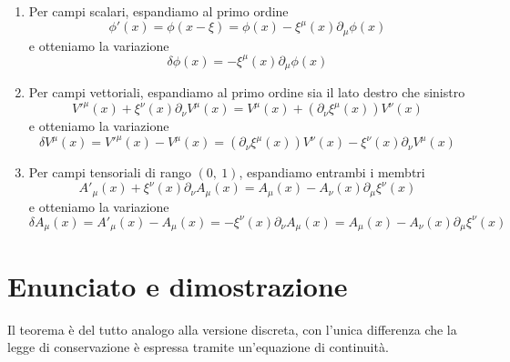     \begin{enumerate}
        \item Per campi scalari, espandiamo al primo ordine
    \begin{equation*}
        \phi'(x) = \phi(x - \xi) = \phi(x) - \xi^\mu(x) \partial_\mu \phi(x)
    \end{equation*}  
        e otteniamo la variazione
    \begin{equation}\label{variazionescalare}
        \delta \phi(x) = - \xi^\mu(x) \partial_\mu \phi(x)
    \end{equation} 
        \item Per campi vettoriali, espandiamo al primo ordine sia il lato destro che sinistro
    \begin{equation*}
        V'^\mu(x) + \xi^\nu(x) \partial_\nu V^\mu (x) = V^\mu(x) + (\partial_\nu \xi^\mu(x)) V^\nu(x)
    \end{equation*}
        e otteniamo la variazione
    \begin{equation}\label{variazionevett}
        \delta V^\mu(x) = V'^\mu(x) - V^\mu(x) = (\partial_\nu \xi^\mu(x)) V^\nu(x) - \xi^\nu (x)\partial_\nu V^\mu(x)
    \end{equation}
        \item Per campi tensoriali di rango $(0,~1)$, espandiamo entrambi i membtri 
    \begin{equation*}
        A'_\mu(x) + \xi^\nu(x) \partial_\nu A_\mu (x) = A_\mu(x) - A_\nu(x) \partial_\mu \xi^\nu(x)
    \end{equation*}
        e otteniamo la variazione
    \begin{equation}\label{variazione10}
        \delta A_\mu(x) = A'_\mu(x) - A_\mu(x) = - \xi^\nu(x) \partial_\nu A_\mu (x) = A_\mu(x) - A_\nu(x) \partial_\mu \xi^\nu(x)
    \end{equation}
    \end{enumerate}

\section{Enunciato e dimostrazione}
    Il teorema è del tutto analogo alla versione discreta, con l'unica differenza che la legge di conservazione è espressa tramite un'equazione di continuità.

